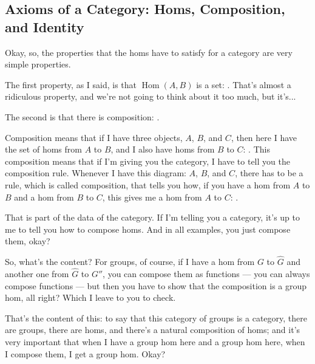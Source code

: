 \begin{speech}[01:11:29 - 01:12:07]
\end{speech}

\begin{hidden}
\end{hidden}

\subsection{Axioms of a Category: Homs, Composition, and Identity}

\begin{speech}[01:12:07 - 01:14:06]
Okay, so, the properties that the homs have to satisfy for a category are very simple properties.

The first property, as I said, is that $\operatorname{Hom}(A, B)$ is a set: . That's almost a ridiculous property, and we're not going to think about it too much, but it's...

The second is that there is composition: .

Composition means that if I have three objects, $A$, $B$, and $C$,  then here I have the set of homs from $A$ to $B$,  and I also have homs from $B$ to $C$: . This composition means that if I'm giving you the category, I have to tell you the composition rule. Whenever I have this diagram: $A$, $B$, and $C$, there has to be a rule, which is called composition, that tells you how, if you have a hom from $A$ to $B$ and a hom from $B$ to $C$, this gives me a hom from $A$ to $C$: .

That is part of the data of the category. If I'm telling you a category, it's up to me to tell you how to compose homs. And in all examples, you just compose them, okay?

So, what's the content? For groups, of course, if I have a hom from $G$ to $\hat{G}$ and another one from $\hat{G}$ to $G''$, you can compose them as functions --- you can always compose functions --- but then you have to show that the composition is a group hom, all right? Which I leave to you to check.

That's the content of this: to say that this category of groups is a category, there are groups, there are homs, and there's a natural composition of homs; and it's very important that when I have a group hom here and a group hom here, when I compose them, I get a group hom. Okay?
\end{speech}

